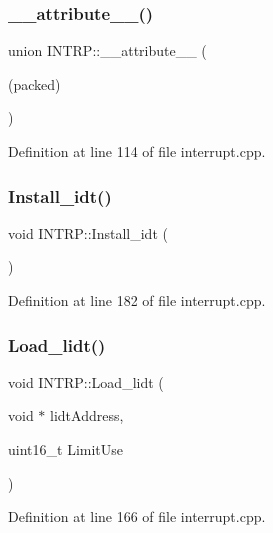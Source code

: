 \subsubsection{\texorpdfstring{\+\_\+\+\_\+attribute\+\_\+\+\_\+()}{\_\_attribute\_\_()}}
{\footnotesize\ttfamily union I\+N\+T\+R\+P\+::\+\_\+\+\_\+attribute\+\_\+\+\_\+ (\begin{DoxyParamCaption}\item[{(packed)}]{ }\end{DoxyParamCaption})}



Definition at line 114 of file interrupt.\+cpp.

\mbox{\label{namespace_i_n_t_r_p_a139b273cc1e45d3c2fdfe0d387a98518}} 
\subsubsection{\texorpdfstring{Install\+\_\+idt()}{Install\_idt()}}
{\footnotesize\ttfamily void I\+N\+T\+R\+P\+::\+Install\+\_\+idt (\begin{DoxyParamCaption}{ }\end{DoxyParamCaption})}



Definition at line 182 of file interrupt.\+cpp.

\mbox{\label{namespace_i_n_t_r_p_a194f85d6c873615e9125466e3b23c30f}} 
\subsubsection{\texorpdfstring{Load\+\_\+lidt()}{Load\_lidt()}}
{\footnotesize\ttfamily void I\+N\+T\+R\+P\+::\+Load\+\_\+lidt (\begin{DoxyParamCaption}\item[{void $\ast$}]{lidt\+Address,  }\item[{uint16\+\_\+t}]{Limit\+Use }\end{DoxyParamCaption})\hspace{0.3cm}{\ttfamily [inline]}}



Definition at line 166 of file interrupt.\+cpp.

